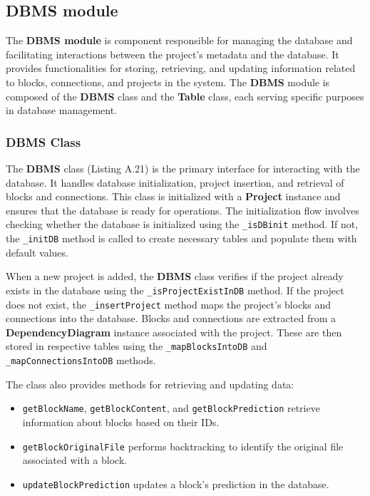 \subsection{DBMS module}

The \textbf{DBMS module} is component responsible for managing the database and facilitating interactions between the project's metadata and the database. It provides functionalities for storing, retrieving, and updating information related to blocks, connections, and projects in the system. The \textbf{DBMS} module is composed of the \textbf{DBMS} class and the \textbf{Table} class, each serving specific purposes in database management.

\subsubsection{DBMS Class}

The \textbf{DBMS} class (Listing A.21) is the primary interface for interacting with the database. It handles database initialization, project insertion, and retrieval of blocks and connections. This class is initialized with a \textbf{Project} instance and ensures that the database is ready for operations. The initialization flow involves checking whether the database is initialized using the \texttt{\_isDBinit} method. If not, the \texttt{\_initDB} method is called to create necessary tables and populate them with default values.

When a new project is added, the \textbf{DBMS} class verifies if the project already exists in the database using the \texttt{\_isProjectExistInDB} method. If the project does not exist, the \texttt{\_insertProject} method maps the project's blocks and connections into the database. Blocks and connections are extracted from a \textbf{DependencyDiagram} instance associated with the project. These are then stored in respective tables using the \texttt{\_mapBlocksIntoDB} and \texttt{\_mapConnectionsIntoDB} methods.

The class also provides methods for retrieving and updating data:
\begin{itemize}
    \item \texttt{getBlockName}, \texttt{getBlockContent}, and \texttt{getBlockPrediction} retrieve information about blocks based on their IDs.
    \item \texttt{getBlockOriginalFile} performs backtracking to identify the original file associated with a block.
    \item \texttt{updateBlockPrediction} updates a block's prediction in the database.
\end{itemize}

